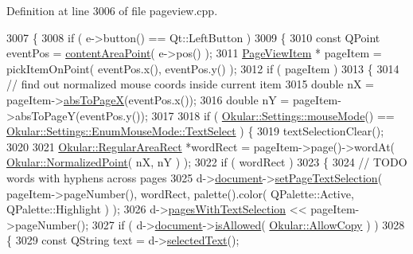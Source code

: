 Definition at line 3006 of file pageview.\+cpp.


\begin{DoxyCode}
3007 \{
3008     \textcolor{keywordflow}{if} ( e->button() == Qt::LeftButton )
3009     \{
3010         \textcolor{keyword}{const} QPoint eventPos = \hyperlink{classPageView_a7f432d3d6d05c69b568ad66a9c232cd7}{contentAreaPoint}( e->pos() );
3011         \hyperlink{classPageViewItem}{PageViewItem} * pageItem = pickItemOnPoint( eventPos.x(), eventPos.y() );
3012         \textcolor{keywordflow}{if} ( pageItem )
3013         \{
3014             \textcolor{comment}{// find out normalized mouse coords inside current item}
3015             \textcolor{keywordtype}{double} nX = pageItem->\hyperlink{classPageViewItem_ac8c32541cbae1efd5b4ab54f0a4b4576}{absToPageX}(eventPos.x());
3016             \textcolor{keywordtype}{double} nY = pageItem->absToPageY(eventPos.y());
3017 
3018             \textcolor{keywordflow}{if} ( \hyperlink{classOkular_1_1Settings_af8e39e25e841b413d67af2cb4dfc0688}{Okular::Settings::mouseMode}() == 
      \hyperlink{classOkular_1_1Settings_1_1EnumMouseMode_ab2ae04e2d7d069f02195ccf32c52415bafafb47a3dab02c4016246ee80090e2d9}{Okular::Settings::EnumMouseMode::TextSelect} ) \{
3019                 textSelectionClear();
3020 
3021                 \hyperlink{classOkular_1_1RegularAreaRect}{Okular::RegularAreaRect} *wordRect = pageItem->page()->wordAt( 
      \hyperlink{classOkular_1_1NormalizedPoint}{Okular::NormalizedPoint}( nX, nY ) );
3022                 \textcolor{keywordflow}{if} ( wordRect )
3023                 \{
3024                     \textcolor{comment}{// TODO words with hyphens across pages}
3025                     d->\hyperlink{classPageViewPrivate_a50645b9853306cffd74e51efb677e5b4}{document}->\hyperlink{classOkular_1_1Document_ade0f70b9e9e3e08647592555f6c58357}{setPageTextSelection}( pageItem->pageNumber(), 
      wordRect, palette().color( QPalette::Active, QPalette::Highlight ) );
3026                     d->\hyperlink{classPageViewPrivate_ad82b596dc262e93c2268297b9eee8956}{pagesWithTextSelection} << pageItem->pageNumber();
3027                     \textcolor{keywordflow}{if} ( d->\hyperlink{classPageViewPrivate_a50645b9853306cffd74e51efb677e5b4}{document}->\hyperlink{classOkular_1_1Document_a6dd7a475b14222c07d1c410311f35cdb}{isAllowed}( 
      \hyperlink{namespaceOkular_a3601f4e702453ddf1125476dd6e7577ba36a60050e67a446a5ff61aac6756718c}{Okular::AllowCopy} ) )
3028                     \{
3029                         \textcolor{keyword}{const} QString text = d->\hyperlink{classPageViewPrivate_a0ecc0d9ad35e6990bc4b82f3649fc6c4}{selectedText}();

\end{DoxyCode}
